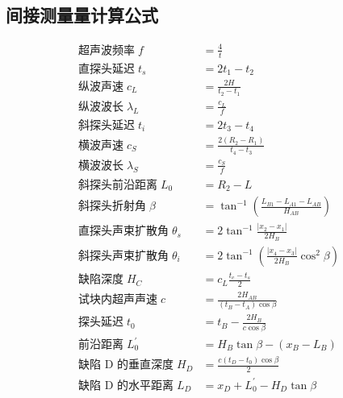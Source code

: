 \subsection{间接测量量计算公式\label{sss:formula}}
\begin{align*}
    \text{超声波频率}\; f&=\frac 4 t \\
    \text{直探头延迟}\; t_s&=2t_1-t_2 \\
    \text{纵波声速}\; c_L&=\frac{2H}{t_2-t_1} \\
    \text{纵波波长}\; \lambda_L&=\frac{c_L}{f} \\
    \text{斜探头延迟}\; t_i&=2t_3-t_4 \\
    \text{横波声速}\; c_S&=\frac{2(R_2-R_1)}{t_4-t_3} \\
    \text{横波波长}\; \lambda_S&=\frac{c_S}{f} \\
    \text{斜探头前沿距离}\; L_0&=R_2-L \\
    \text{斜探头折射角}\; \beta&=\tan^{-1}\left(\frac{L_{B1}-L_{A1}-L_{AB}}{H_{AB}}\right) \\
    \text{直探头声束扩散角}\; \theta_s&=2\tan^{-1}\frac{\left|x_2-x_1\right|}{2H_B} \\
    \text{斜探头声束扩散角}\; \theta_i&=2\tan^{-1}\left(\frac{\left|x_4-x_3\right|}{2H_B}\cos^2 \beta \right) \\ 
    \text{缺陷深度}\; H_C&=c_L\frac{t_c-t_s}{2} \\
    \text{试块内超声声速}\; c&=\frac{2H_{AB}}{(t_B-t_A)\cos \beta} \\
    \text{探头延迟}\; t_0&=t_B-\frac{2H_{B}}{c\cos \beta} \\
    \text{前沿距离}\; L_0^{'}&=H_B\tan\beta-(x_B-L_B) \\
    \text{缺陷 D 的垂直深度}\; H_D&=\frac{c(t_D-t_0)\cos\beta}{2} \\
    \text{缺陷 D 的水平距离}\; L_D&=x_D+L_0^{'}-H_D\tan\beta
\end{align*}

